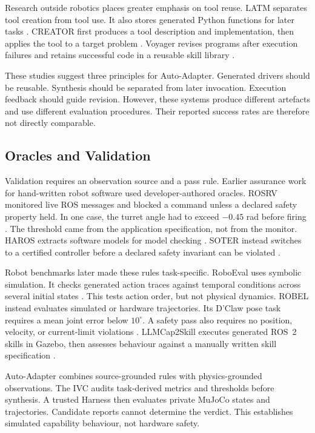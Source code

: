 Research outside robotics places greater emphasis on tool reuse. LATM separates
tool creation from tool use. It also stores generated Python functions for later
tasks \citep{cai2023latm}. CREATOR first produces a tool description and
implementation, then applies the tool to a target problem
\citep{qian2023creator}. Voyager revises programs after execution failures and
retains successful code in a reusable skill library \citep{wang2023voyager}.

These studies suggest three principles for Auto-Adapter. Generated drivers
should be reusable. Synthesis should be separated from later invocation.
Execution feedback should guide revision. However, these systems produce
different artefacts and use different evaluation procedures. Their reported
success rates are therefore not directly comparable.

\subsection{Oracles and Validation}
\label{sec:oracles-validation}

Validation requires an observation source and a pass rule. Earlier assurance
work for hand-written robot software used developer-authored oracles. ROSRV
monitored live ROS messages and blocked a command unless a declared safety
property held. In one case, the turret angle had to exceed \(-0.45\) rad before
firing \citep{huang2014rosrv}. The threshold came from the application
specification, not from the monitor. HAROS extracts software models for model
checking \citep{santos2021haros}. SOTER instead switches to a certified
controller before a declared safety invariant can be violated
\citep{desai2019soter}.

Robot benchmarks later made these rules task-specific. RoboEval uses symbolic
simulation. It checks generated action traces against temporal conditions across
several initial states \citep{hu2024codebotler}. This tests action order, but not
physical dynamics. ROBEL instead evaluates simulated or hardware trajectories.
Its D'Claw pose task requires a mean joint error below \(10^\circ\). A safety
pass also requires no position, velocity, or current-limit violations
\citep{ahn2020robel}. LLMCap2Skill executes generated ROS~2 skills in Gazebo,
then assesses behaviour against a manually written skill specification
\citep{vieira2025cap2skill}.

Auto-Adapter combines source-grounded rules with physics-grounded observations.
The IVC audits task-derived metrics and thresholds before synthesis. A trusted
Harness then evaluates private MuJoCo states and trajectories. Candidate reports
cannot determine the verdict. This establishes simulated capability behaviour,
not hardware safety.
